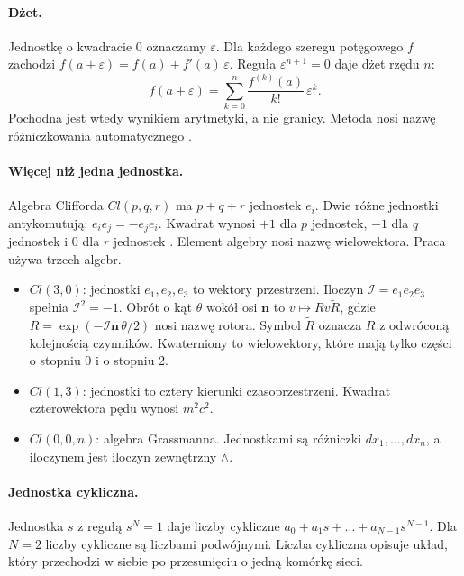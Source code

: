 \documentclass[11pt,a4paper]{article}
\newcommand{\ps}{\mathcal{I}}                %
\begin{document}
\paragraph{Dżet.}
Jednostkę o kwadracie $0$ oznaczamy $\varepsilon$. Dla każdego szeregu
potęgowego $f$ zachodzi $f(a+\varepsilon)=f(a)+f'(a)\,\varepsilon$. Reguła
$\varepsilon^{n+1}=0$ daje dżet rzędu $n$:
\begin{equation}
\label{eq:jet}
f(a+\varepsilon)=\sum_{k=0}^{n}\frac{f^{(k)}(a)}{k!}\,\varepsilon^{k}.
\end{equation}
Pochodna jest wtedy wynikiem arytmetyki, a nie granicy. Metoda nosi nazwę
różniczkowania automatycznego \cite{griewank2008}.

\paragraph{Więcej niż jedna jednostka.}
Algebra Clifforda $Cl(p,q,r)$ ma $p+q+r$ jednostek $e_{i}$. Dwie różne jednostki
antykomutują: $e_{i}e_{j}=-e_{j}e_{i}$. Kwadrat wynosi $+1$ dla $p$ jednostek,
$-1$ dla $q$ jednostek i $0$ dla $r$ jednostek \cite{clifford1878,doran2003}.
Element algebry nosi nazwę wielowektora. Praca używa trzech algebr.
\begin{itemize}[leftmargin=1.6em]
  \item $Cl(3,0)$: jednostki $e_{1}, e_{2}, e_{3}$ to wektory przestrzeni.
        Iloczyn $\ps=e_{1}e_{2}e_{3}$ spełnia $\ps^{2}=-1$. Obrót o kąt
        $\theta$ wokół osi $\mathbf{n}$ to $v\mapsto Rv\tilde{R}$, gdzie
        $R=\exp(-\ps\mathbf{n}\,\theta/2)$ nosi nazwę rotora. Symbol
        $\tilde{R}$ oznacza $R$ z odwróconą kolejnością czynników. Kwaterniony
        to wielowektory, które mają tylko części o stopniu 0 i o stopniu 2.
  \item $Cl(1,3)$: jednostki to cztery kierunki czasoprzestrzeni. Kwadrat
        czterowektora pędu wynosi $m^{2}c^{2}$.
  \item $Cl(0,0,n)$: algebra Grassmanna. Jednostkami są różniczki
        $dx_{1},\dots, dx_{n}$, a iloczynem jest iloczyn zewnętrzny $\wedge$.
\end{itemize}

\paragraph{Jednostka cykliczna.}
Jednostka $s$ z regułą $s^{N}=1$ daje liczby cykliczne
$a_{0}+a_{1}s+\dots+a_{N-1}s^{N-1}$. Dla $N=2$ liczby cykliczne są liczbami
podwójnymi. Liczba cykliczna opisuje układ, który przechodzi w siebie po
przesunięciu o jedną komórkę sieci.
\end{document}

